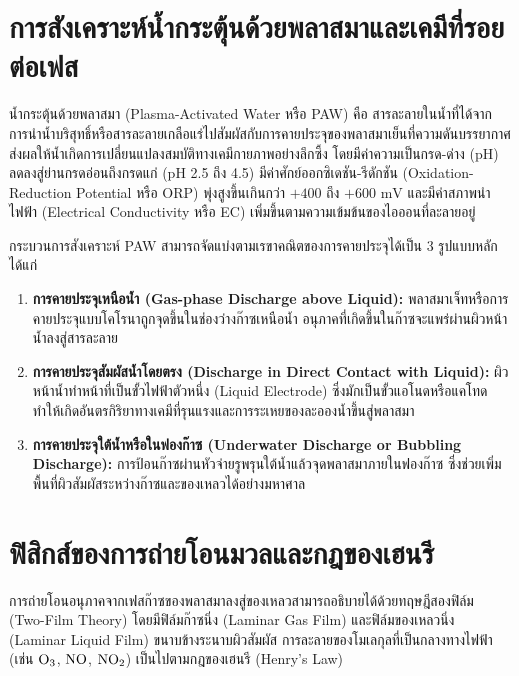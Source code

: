 \clearpage


\section{การสังเคราะห์น้ำกระตุ้นด้วยพลาสมาและเคมีที่รอยต่อเฟส}

น้ำกระตุ้นด้วยพลาสมา (Plasma-Activated Water หรือ PAW) คือ สารละลายในน้ำที่ได้จากการนำน้ำบริสุทธิ์หรือสารละลายเกลือแร่ไปสัมผัสกับการคายประจุของพลาสมาเย็นที่ความดันบรรยากาศ ส่งผลให้น้ำเกิดการเปลี่ยนแปลงสมบัติทางเคมีกายภาพอย่างลึกซึ้ง โดยมีค่าความเป็นกรด-ด่าง (pH) ลดลงสู่ย่านกรดอ่อนถึงกรดแก่ (pH 2.5 ถึง 4.5) มีค่าศักย์ออกซิเดชัน-รีดักชัน (Oxidation-Reduction Potential หรือ ORP) พุ่งสูงขึ้นเกินกว่า $+400$ ถึง $+600 \text{ mV}$ และมีค่าสภาพนำไฟฟ้า (Electrical Conductivity หรือ EC) เพิ่มขึ้นตามความเข้มข้นของไอออนที่ละลายอยู่

กระบวนการสังเคราะห์ PAW สามารถจัดแบ่งตามเรขาคณิตของการคายประจุได้เป็น 3 รูปแบบหลัก ได้แก่

\begin{enumerate}
    \item \textbf{การคายประจุเหนือน้ำ (Gas-phase Discharge above Liquid):} พลาสมาเจ็ทหรือการคายประจุแบบโคโรนาถูกจุดขึ้นในช่องว่างก๊าซเหนือน้ำ อนุภาคที่เกิดขึ้นในก๊าซจะแพร่ผ่านผิวหน้าน้ำลงสู่สารละลาย
    \item \textbf{การคายประจุสัมผัสน้ำโดยตรง (Discharge in Direct Contact with Liquid):} ผิวหน้าน้ำทำหน้าที่เป็นขั้วไฟฟ้าตัวหนึ่ง (Liquid Electrode) ซึ่งมักเป็นขั้วแอโนดหรือแคโทด ทำให้เกิดอันตรกิริยาทางเคมีที่รุนแรงและการระเหยของละอองน้ำขึ้นสู่พลาสมา
    \item \textbf{การคายประจุใต้น้ำหรือในฟองก๊าซ (Underwater Discharge or Bubbling Discharge):} การป้อนก๊าซผ่านหัวจ่ายรูพรุนใต้น้ำแล้วจุดพลาสมาภายในฟองก๊าซ ซึ่งช่วยเพิ่มพื้นที่ผิวสัมผัสระหว่างก๊าซและของเหลวได้อย่างมหาศาล
\end{enumerate}

\section{ฟิสิกส์ของการถ่ายโอนมวลและกฎของเฮนรี}

การถ่ายโอนอนุภาคจากเฟสก๊าซของพลาสมาลงสู่ของเหลวสามารถอธิบายได้ด้วยทฤษฎีสองฟิล์ม (Two-Film Theory) โดยมีฟิล์มก๊าซนิ่ง (Laminar Gas Film) และฟิล์มของเหลวนิ่ง (Laminar Liquid Film) ขนาบข้างระนาบผิวสัมผัส การละลายของโมเลกุลที่เป็นกลางทางไฟฟ้า (เช่น $\ce{O3}$, $\ce{NO}$, $\ce{NO2}$) เป็นไปตามกฎของเฮนรี (Henry's Law)

